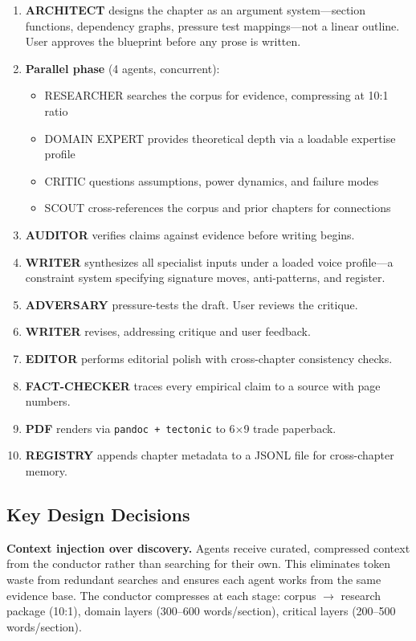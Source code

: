 \documentclass[11pt]{article}
\begin{document}
\begin{enumerate}[nosep]
  \item \textbf{ARCHITECT} designs the chapter as an argument system---section functions,
        dependency graphs, pressure test mappings---not a linear outline. User approves
        the blueprint before any prose is written.
  \item \textbf{Parallel phase} (4 agents, concurrent):
    \begin{itemize}[nosep]
      \item RESEARCHER searches the corpus for evidence, compressing at 10:1 ratio
      \item DOMAIN EXPERT provides theoretical depth via a loadable expertise profile
      \item CRITIC questions assumptions, power dynamics, and failure modes
      \item SCOUT cross-references the corpus and prior chapters for connections
    \end{itemize}
  \item \textbf{AUDITOR} verifies claims against evidence before writing begins.
  \item \textbf{WRITER} synthesizes all specialist inputs under a loaded voice profile---a
        constraint system specifying signature moves, anti-patterns, and register.
  \item \textbf{ADVERSARY} pressure-tests the draft. User reviews the critique.
  \item \textbf{WRITER} revises, addressing critique and user feedback.
  \item \textbf{EDITOR} performs editorial polish with cross-chapter consistency checks.
  \item \textbf{FACT-CHECKER} traces every empirical claim to a source with page numbers.
  \item \textbf{PDF} renders via \texttt{pandoc + tectonic} to 6$\times$9 trade paperback.
  \item \textbf{REGISTRY} appends chapter metadata to a JSONL file for cross-chapter memory.
\end{enumerate}

\subsection{Key Design Decisions}

\textbf{Context injection over discovery.} Agents receive curated, compressed context
from the conductor rather than searching for their own. This eliminates token waste
from redundant searches and ensures each agent works from the same evidence base.
The conductor compresses at each stage: corpus $\rightarrow$ research package (10:1),
domain layers (300--600 words/section), critical layers (200--500 words/section).
\end{document}
